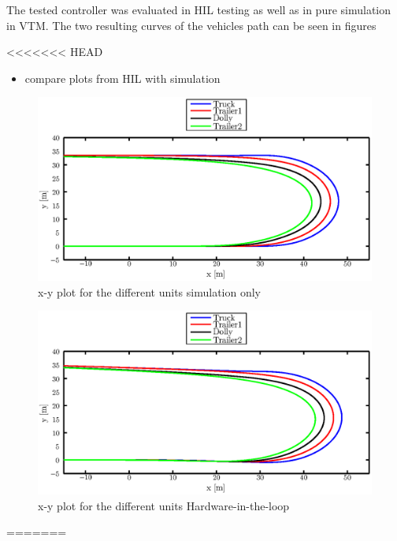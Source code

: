 \documentclass[ExampleMasters.tex]{subfiles}
\begin{document}
The tested controller was evaluated in \gls{HIL} testing as well as in pure simulation in \gls{VTM}. The two resulting curves of the vehicles path can be seen in figures 

<<<<<<< HEAD
\begin{itemize}
	\item compare plots from \gls{HIL}  with simulation
\end{itemize}
\begin{figure}[!htb]
	\centering
	\includegraphics[width=1\linewidth]{figures/xy_VTM}
	\caption{x-y plot for the different units simulation only}
	
	\label{fig:xy_VTM}
\end{figure}
\begin{figure}[!htb]
	\centering
	\includegraphics[width=1\linewidth]{figures/xy_HIL}
	\caption{x-y plot for the different units Hardware-in-the-loop}
	
	\label{fig:xy_HIL}
\end{figure}
=======
\end{document}
